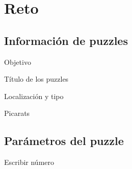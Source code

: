 \section{Reto}
\subsection{Información de puzzles}
\begin{frame}{Objetivo}
\end{frame}

\begin{frame}[t]{Título de los puzzles}
\end{frame}

\begin{frame}{Localización y tipo}
\end{frame}

\begin{frame}{Picarats}
\end{frame}

\subsection{Parámetros del puzzle}
\begin{frame}{Escribir número}
\end{frame}
